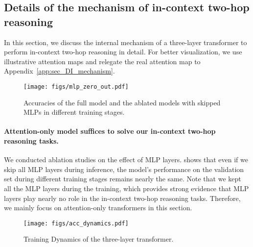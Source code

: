 

\subsection{Details of the mechanism of in-context two-hop reasoning}
\label{sec:illustration_mechanism}


In this section, we discuss the internal mechanism of a three-layer transformer to perform in-context two-hop reasoning in detail. For better visualization, we use illustrative attention maps and relegate the real attention map to Appendix~\ref{app:sec_DI_mechanism}.

\begin{figure}[h]
    \centering
    \texttt{[image: figs/mlp\_zero\_out.pdf]}
    \caption{Accuracies of the full model and the ablated models with skipped MLPs in different training stages.}
    \label{fig:mlp_zero_out}
\end{figure}

\paragraph{Attention-only model suffices to solve our in-context two-hop reasoning tasks.} We conducted ablation studies on the effect of MLP layers.  shows that even if we skip all MLP layers during inference, the model's performance on the validation set during different training stages remains nearly the same. Note that we kept all the MLP layers during the training, which provides strong evidence that MLP layers play nearly no role in the in-context two-hop reasoning tasks. Therefore, we mainly focus on attention-only transformers in this section. 

\begin{figure}[h]
    \centering
    \texttt{[image: figs/acc\_dynamics.pdf]}
    \caption{Training Dynamics of the three-layer transformer.}
    \label{fig:acc_dynamics}
\end{figure}

